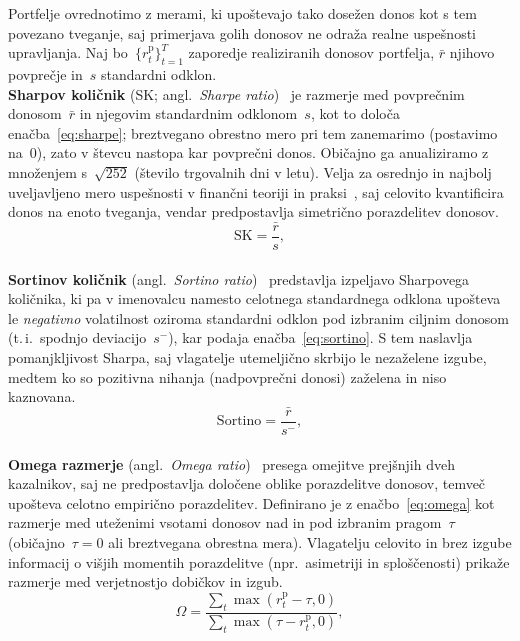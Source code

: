 Portfelje ovrednotimo z merami, ki upoštevajo tako dosežen donos kot s tem povezano tveganje, saj primerjava golih donosov ne odraža realne uspešnosti upravljanja. Naj bo~$\{r^{\text{p}}_t\}_{t=1}^{T}$ zaporedje realiziranih donosov portfelja, $\bar r$ njihovo povprečje in~$s$ standardni odklon.\\

\noindent\textbf{Sharpov količnik} (SK; angl.\ \emph{Sharpe ratio})~\cite{sharpe1994} je razmerje med povprečnim donosom~$\bar r$ in njegovim standardnim odklonom~$s$, kot to določa enačba~\eqref{eq:sharpe}; breztvegano obrestno mero pri tem zanemarimo (postavimo na~$0$), zato v števcu nastopa kar povprečni donos. Običajno ga anualiziramo z množenjem s~$\sqrt{252}$ (število trgovalnih dni v letu). Velja za osrednjo in najbolj uveljavljeno mero uspešnosti v finančni teoriji in praksi~\cite{demiguel2009}, saj celovito kvantificira donos na enoto tveganja, vendar predpostavlja simetrično porazdelitev donosov.
\begin{equation}
\label{eq:sharpe}
  \mathrm{SK} = \frac{\bar r}{s},
\end{equation}\\

\noindent\textbf{Sortinov količnik} (angl.\ \emph{Sortino ratio})~\cite{sortino1994} predstavlja izpeljavo Sharpovega količnika, ki pa v imenovalcu namesto celotnega standardnega odklona upošteva le \emph{negativno} volatilnost oziroma standardni odklon pod izbranim ciljnim donosom (t.\,i.\ spodnjo deviacijo~$s^-$), kar podaja enačba~\eqref{eq:sortino}. S tem naslavlja pomanjkljivost Sharpa, saj vlagatelje utemeljično skrbijo le nezaželene izgube, medtem ko so pozitivna nihanja (nadpovprečni donosi) zaželena in niso kaznovana.
\begin{equation}
\label{eq:sortino}
  \mathrm{Sortino} = \frac{\bar r}{s^-},
\end{equation}\\

\noindent\textbf{Omega razmerje} (angl.\ \emph{Omega ratio})~\cite{keating2002} presega omejitve prejšnjih dveh kazalnikov, saj ne predpostavlja določene oblike porazdelitve donosov, temveč upošteva celotno empirično porazdelitev. Definirano je z enačbo~\eqref{eq:omega} kot razmerje med uteženimi vsotami donosov nad in pod izbranim pragom~$\tau$ (običajno~$\tau=0$ ali breztvegana obrestna mera). Vlagatelju celovito in brez izgube informacij o višjih momentih porazdelitve (npr.\ asimetriji in sploščenosti) prikaže razmerje med verjetnostjo dobičkov in izgub.
\begin{equation}
\label{eq:omega}
  \Omega = \frac{\sum_t \max(r^{\text{p}}_t-\tau,0)}{\sum_t \max(\tau-r^{\text{p}}_t,0)},
\end{equation}\\

